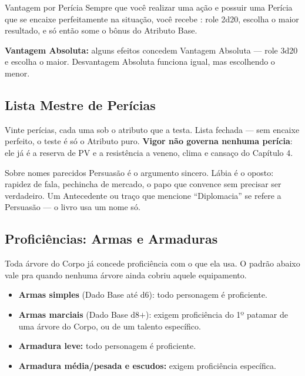 \begin{nota}{Vantagem por Perícia}
    Sempre que você realizar uma ação e possuir uma Perícia que se encaixe perfeitamente
    na situação, você recebe : role 2d20, escolha o maior resultado, e só
    então some o bônus do Atributo Base.

    \medskip
    \textbf{Vantagem Absoluta:} alguns efeitos concedem Vantagem Absoluta --- role 3d20 e
    escolha o maior. Desvantagem Absoluta funciona igual, mas escolhendo o menor.
\end{nota}

\subsection{Lista Mestre de Perícias}

Vinte perícias, cada uma sob o atributo que a testa. Lista fechada --- sem encaixe
perfeito, o teste é só o Atributo puro. \textbf{Vigor não governa nenhuma perícia}: ele já
é a reserva de PV e a resistência a veneno, clima e cansaço do Capítulo 4.



\begin{nota}{Sobre nomes parecidos}
    Persuasão é o argumento sincero. Lábia é o oposto: rapidez de fala, pechincha de
    mercado, o papo que convence sem precisar ser verdadeiro. Um Antecedente ou traço que
    mencione \enquote{Diplomacia} se refere a Persuasão --- o livro usa um nome só.
\end{nota}

\subsection{Proficiências: Armas e Armaduras}

Toda árvore do Corpo já concede proficiência com o que ela usa. O padrão abaixo vale pra
quando nenhuma árvore ainda cobriu aquele equipamento.

\begin{itemize}
    \item \textbf{Armas simples} (Dado Base até d6): todo personagem é proficiente.
    \item \textbf{Armas marciais} (Dado Base d8$+$): exigem proficiência do 1º patamar de
          uma árvore do Corpo, ou de um talento específico.
    \item \textbf{Armadura leve:} todo personagem é proficiente.
    \item \textbf{Armadura média/pesada e escudos:} exigem proficiência específica.
\end{itemize}

